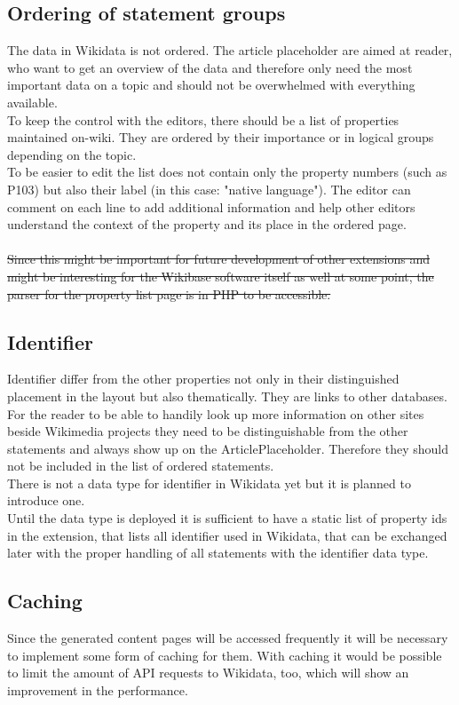 \subsection{Ordering of statement groups}
The data in Wikidata is not ordered. The article placeholder are aimed at reader, who want to get an overview of the data and therefore only need the most important data on a topic and should not be overwhelmed with everything available. 
\\
To keep the control with the editors, there should be a list of properties maintained on-wiki. They are ordered by their importance or in logical groups depending on the topic. \\
To be easier to edit the list does not contain only the property numbers (such as P103) but also their label (in this case: "native language"). The editor can comment on each line to add additional information and help other editors understand the context of the property and its place in the ordered page. \\
\\
\st{Since this might be important for future development of other extensions and might be interesting for the Wikibase software itself as well at some point, the parser for the property list page is in PHP to be accessible.}  \\

\subsection {Identifier}
Identifier differ from the other properties not only in their distinguished placement in the layout but also thematically. They are links to other databases. For the reader to be able to handily look up more information on other sites beside Wikimedia projects they need to be distinguishable from the other statements and always show up on the ArticlePlaceholder. Therefore they should not be included in the list of ordered statements. \\
There is not a data type for identifier in Wikidata yet but it is planned to introduce one. \\
Until the data type is deployed it is sufficient to have a static list of property ids in the extension, that lists all identifier used in Wikidata, that can be exchanged later with the proper handling of all statements with the identifier data type. 

\subsection{Caching}
Since the generated content pages will be accessed frequently  it will be necessary to implement some form of caching for them. With caching it would be possible to limit the amount of API requests to Wikidata, too, which will show an improvement in the performance. 

